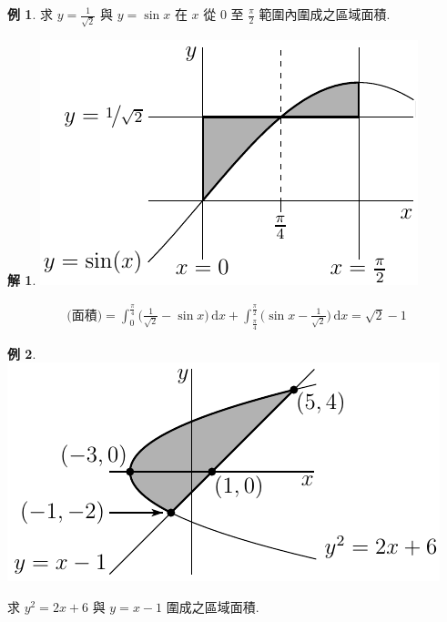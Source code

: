 \documentclass[12pt]{extarticle}
\newcommand{\ds}{\displaystyle}
\theoremstyle{definition}
\newtheorem*{ex}{例}
\newtheorem*{sol}{解}
\begin{document}
\begin{ex}
  求 $\ds y = \frac{1}{\sqrt{2}}$ 與 $y = \sin x$ 在 $x$ 從 $0$ 至 $\ds\frac{\pi}{2}$ 範圍內圍成之區域面積.
\end{ex}

\begin{sol}
  \begin{minipage}{.3\textwidth}
    \includegraphics[scale=1]{areaCross} 
  \end{minipage}
  \begin{minipage}{.7\textwidth}
    \begin{align*}
      \text{(面積)} = \int_0^{\frac{\pi}{4}}\!\Big(\frac{1}{\sqrt{2}} - \sin x\Big)\,\text{d}x + \int_{\frac{\pi}{4}}^{\frac{\pi}{2}}\!\Big(\sin x - \frac{1}{\sqrt{2}}\Big)\,\text{d}x = \sqrt{2} - 1
    \end{align*}
  \end{minipage}
\end{sol}

\begin{ex}
  \begin{minipage}{.5\textwidth}
    \includegraphics[scale=1]{areaY}
  \end{minipage}
  \begin{minipage}{.5\textwidth}
    求 $y^2 = 2x + 6$ 與 $y = x - 1$ 圍成之區域面積.
  \end{minipage}
\end{ex}
\end{document}
